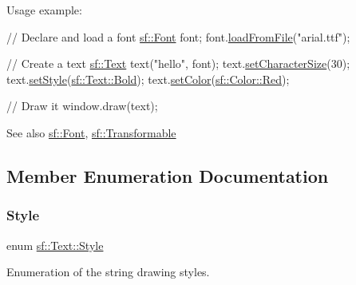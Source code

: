 Usage example\+: 
\begin{DoxyCode}
\textcolor{comment}{// Declare and load a font}
\hyperlink{classsf_1_1_font}{sf::Font} font;
font.\hyperlink{classsf_1_1_font_ab020052ef4e01f6c749a85571c0f3fd1}{loadFromFile}(\textcolor{stringliteral}{"arial.ttf"});

\textcolor{comment}{// Create a text}
\hyperlink{classsf_1_1_text}{sf::Text} text(\textcolor{stringliteral}{"hello"}, font);
text.\hyperlink{classsf_1_1_text_ae96f835fc1bff858f8a23c5b01eaaf7e}{setCharacterSize}(30);
text.\hyperlink{classsf_1_1_text_ad791702bc2d1b6590a1719aa60635edf}{setStyle}(\hyperlink{classsf_1_1_text_aa8add4aef484c6e6b20faff07452bd82af1b47f98fb1e10509ba930a596987171}{sf::Text::Bold});
text.\hyperlink{classsf_1_1_text_a6ce65272d6d63ed01118366e92c68132}{setColor}(\hyperlink{classsf_1_1_color_a127dbf55db9c07d0fa8f4bfcbb97594a}{sf::Color::Red});

\textcolor{comment}{// Draw it}
window.draw(text);
\end{DoxyCode}


\begin{DoxySeeAlso}{See also}
\hyperlink{classsf_1_1_font}{sf\+::\+Font}, \hyperlink{classsf_1_1_transformable}{sf\+::\+Transformable} 
\end{DoxySeeAlso}


\subsection{Member Enumeration Documentation}
\mbox{\label{classsf_1_1_text_aa8add4aef484c6e6b20faff07452bd82}} 
\subsubsection{\texorpdfstring{Style}{Style}}
{\footnotesize\ttfamily enum \hyperlink{classsf_1_1_text_aa8add4aef484c6e6b20faff07452bd82}{sf\+::\+Text\+::\+Style}}



Enumeration of the string drawing styles. 


